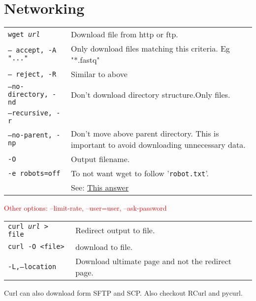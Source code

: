\section{Networking}

\begin{tabularx}{\linewidth}{lX}
\hline
\texttt{wget \textit{url}} & Download file from http or ftp.\\
\texttt{-- accept, -A "..."} & Only download files matching this criteria. Eg "*.fastq"\\
\texttt{-- reject, -R} & Similar to above\\
\texttt{--no-directory, -nd} & Don't download directory structure.Only files.\\
\texttt{--recursive, -r} & \\
\texttt{--no-parent, -np} & Don't move above parent directory. This is important to avoid downloading unnecessary data.\\
\texttt{-O} & Output filename.\\
\texttt{-e robots=off} & To not want wget to follow '\texttt{robot.txt}'.\\
& See: \href{https://stackoverflow.com/a/11124664}{This answer} \\
\hline
\end{tabularx}

\textcolor{red}{Other options: --limit-rate, --user=user, --ask-password}\\


\begin{tabularx}{\linewidth}{lX}
\hline
\texttt{curl \textit{url} > file} & Redirect output to file.\\
\texttt{curl -O <file>} & download to file.\\
\texttt{-L,--location} & Download ultimate page and not the redirect page.\\
\hline
\end{tabularx}
Curl can also download form SFTP and SCP. Also checkout RCurl and pycurl.

